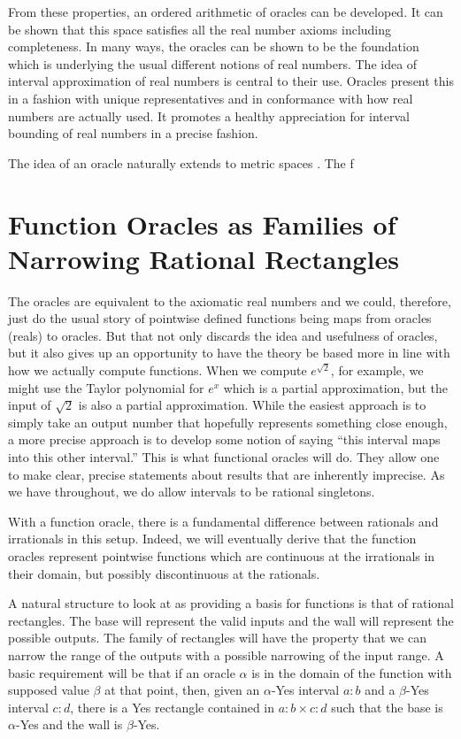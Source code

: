 \documentclass[12pt]{article}
\begin{document}
From these properties, an ordered arithmetic of oracles can be developed. It can be shown that this space satisfies all the real number axioms including completeness. In many ways, the oracles can be shown to be the foundation which is underlying the usual different notions of real numbers. The idea of interval approximation of real numbers is central to their use. Oracles present this in a fashion with unique representatives and in conformance with how real numbers are actually used. It promotes a healthy appreciation for interval bounding of real numbers in a precise fashion. 

The idea of an oracle naturally extends to metric spaces \cite{taylor23metric}. The f



\section{Function Oracles as Families of Narrowing Rational Rectangles}\label{sec:funora}

The oracles are equivalent to the axiomatic real numbers and we could, therefore, just do the usual story of pointwise defined functions being maps from oracles (reals) to oracles. But that not only discards the idea and usefulness of oracles, but it also gives up an opportunity to have the theory be based more in line with how we actually compute functions. When we compute $e^{\sqrt{2}}$, for example, we might use the Taylor polynomial for $e^x$ which is a partial approximation, but the input of $\sqrt{2}$ is also a partial approximation. While the easiest approach is to simply take an output number that hopefully represents something close enough, a more precise approach is to develop some notion of saying ``this interval maps into this other interval.'' This is what functional oracles will do. They allow one to make clear, precise statements about results that are inherently imprecise. As we have throughout, we do allow intervals to be rational singletons. 

With a function oracle, there is a fundamental difference between rationals and irrationals in this setup. Indeed, we will eventually derive that the function oracles represent pointwise functions which are continuous at the irrationals in their domain, but possibly discontinuous at the rationals.

A natural structure to look at as providing a basis for functions is that of rational rectangles. The base will represent the valid inputs and the wall will represent the possible outputs. The family of rectangles will have the property that we can narrow the range of the outputs with a possible narrowing of the input range. A basic requirement will be that if an oracle $\alpha$ is in the domain of the function with supposed value $\beta$ at that point, then, given an $\alpha$-Yes interval $a:b$ and a $\beta$-Yes interval $c:d$, there is a Yes rectangle contained in $a:b \times c:d$ such that the base is $\alpha$-Yes and the wall is $\beta$-Yes. 
\end{document}
